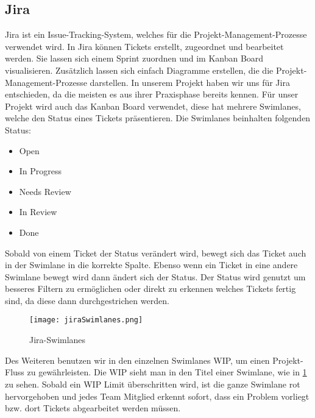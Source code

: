 \subsection{Jira}
    Jira ist ein Issue-Tracking-System, welches für die Projekt-Management-Prozesse verwendet wird.
    In Jira können Tickets erstellt, zugeordnet und bearbeitet werden. Sie lassen sich einem Sprint zuordnen und im Kanban Board visualisieren.
    Zusätzlich lassen sich einfach Diagramme erstellen, die die Projekt-Management-Prozesse darstellen.
    In unserem Projekt haben wir uns für Jira entschieden, da die meisten es aus ihrer Praxisphase bereits kennen.
    Für unser Projekt wird auch das Kanban Board verwendet, diese hat mehrere Swimlanes, welche den Status eines Tickets präsentieren.
    Die Swimlanes beinhalten folgenden Status:
    \begin{itemize}
        \item Open
        \item In Progress
        \item Needs Review
        \item In Review
        \item Done
    \end{itemize}
    Sobald von einem Ticket der Status verändert wird, bewegt sich das Ticket auch in der Swimlane in die korrekte Spalte. Ebenso wenn ein Ticket in eine andere Swimlane bewegt wird dann ändert sich der Status.
    Der Status wird genutzt um besseres Filtern zu ermöglichen oder direkt zu erkennen welches Tickets fertig sind, da diese dann durchgestrichen werden.
    \begin{figure}[!hbt]
        \texttt{[image: jiraSwimlanes.png]}
        \caption{Jira-Swimlanes}
        \label{fig:Jira-Swimlanes}
    \end{figure}  
    Des Weiteren benutzen wir in den einzelnen Swimlanes \ac{WIP}, um einen Projekt-Fluss zu gewährleisten. Die \ac{WIP} sieht man in den Titel einer Swimlane, wie in \ref{fig:Jira-Swimlanes} zu sehen.
    Sobald ein \ac{WIP} Limit überschritten wird, ist die ganze Swimlane rot hervorgehoben und jedes Team Mitglied erkennt sofort, dass ein Problem vorliegt bzw. dort Tickets abgearbeitet werden müssen.
